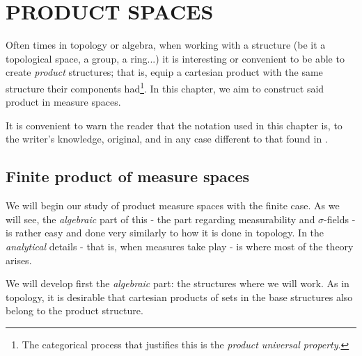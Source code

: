 
\chapter{PRODUCT SPACES}\label{chapter:product spaces}

Often times in topology or algebra, when working with a structure (be it a topological space, a group, a ring...) it is interesting or convenient to be able to create \emph{product} structures; that is, equip a cartesian product with the same structure their components had\footnote{The categorical process that justifies this is the \emph{product universal property}.}. In this chapter, we aim to construct said product in measure spaces.

It is convenient to warn the reader that the notation used in this chapter 
is, to the writer's knowledge, original, and in any case different to that found in \cite{ash1972real}.
\section{Finite product of measure spaces}\label{subsection:product measures}

We will begin our study of product measure spaces with the finite case. As we will see, the \emph{algebraic} part of this - the part regarding measurability and \(\sigma\)-fields - is rather easy and done very similarly to how it is done in topology. In the \emph{analytical} details - that is, when measures take play - is where most of the theory arises.

We will develop first the \emph{algebraic} part: the structures where we will work. As in topology, it is desirable that cartesian products of sets in the base structures also belong to the product structure. 

